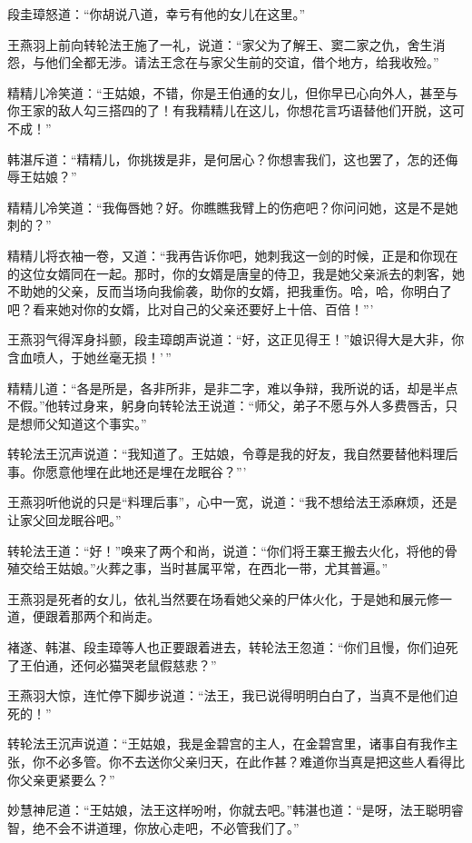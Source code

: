 \documentclass[12pt,oneside]{book}
\begin{document}
段圭璋怒道：``你胡说八道，幸亏有他的女儿在这里。''

王燕羽上前向转轮法王施了一礼，说道：``家父为了解王、窦二家之仇，舍生消怨，与他们全都无涉。请法王念在与家父生前的交谊，借个地方，给我收殓。''

精精儿冷笑道：``王姑娘，不错，你是王伯通的女儿，但你早已心向外人，甚至与你王家的敌人勾三搭四的了！有我精精儿在这儿，你想花言巧语替他们开脱，这可不成！''

韩湛斥道：``精精儿，你挑拨是非，是何居心？你想害我们，这也罢了，怎的还侮辱王姑娘？''

精精儿冷笑道：``我侮唇她？好。你瞧瞧我臂上的伤疤吧？你问问她，这是不是她刺的？''

精精儿将衣袖一卷，又道：``我再告诉你吧，她刺我这一剑的时候，正是和你现在的这位女婿同在一起。那时，你的女婿是唐皇的侍卫，我是她父亲派去的刺客，她不助她的父亲，反而当场向我偷袭，助你的女婿，把我重伤。哈，哈，你明白了吧？看来她对你的女婿，比对自己的父亲还要好上十倍、百倍！'''

王燕羽气得浑身抖颤，段圭璋朗声说道：``好，这正见得王！''娘识得大是大非，你含血喷人，于她丝毫无损！'\,''

精精儿道：``各是所是，各非所非，是非二字，难以争辩，我所说的话，却是半点不假。''他转过身来，躬身向转轮法王说道：``师父，弟子不愿与外人多费唇舌，只是想师父知道这个事实。''

转轮法王沉声说道：``我知道了。王姑娘，令尊是我的好友，我自然要替他料理后事。你愿意他埋在此地还是埋在龙眠谷？'''

王燕羽听他说的只是``料理后事''，心中一宽，说道：``我不想给法王添麻烦，还是让家父回龙眠谷吧。''

转轮法王道：``好！''唤来了两个和尚，说道：``你们将王寨王搬去火化，将他的骨殖交给王姑娘。''火葬之事，当时甚属平常，在西北一带，尤其普遍。''

王燕羽是死者的女儿，依礼当然要在场看她父亲的尸体火化，于是她和展元修一道，便跟着那两个和尚走。

褚遂、韩湛、段圭璋等人也正要跟着进去，转轮法王忽道：``你们且慢，你们迫死了王伯通，还何必猫哭老鼠假慈悲？''

王燕羽大惊，连忙停下脚步说道：``法王，我已说得明明白白了，当真不是他们迫死的！''

转轮法王沉声说道：``王姑娘，我是金碧宫的主人，在金碧宫里，诸事自有我作主张，你不必多管。你不去送你父亲归天，在此作甚？难道你当真是把这些人看得比你父亲更紧要么？''

妙慧神尼道：``王姑娘，法王这样吩咐，你就去吧。''韩湛也道：``是呀，法王聪明睿智，绝不会不讲道理，你放心走吧，不必管我们了。''
\end{document}
